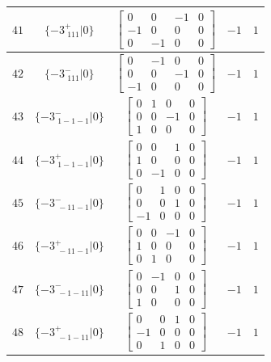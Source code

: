 \documentclass[fleqn,8pt]{jsarticle}
\begin{document}
\begin{longtable}{ccccc}
$ 41 $ & $ \{-3^{+}_{\,\,111}|0\} $ & $ \begin{bmatrix} 0 & 0 & -1 & 0 \\ -1 & 0 & 0 & 0 \\ 0 & -1 & 0 & 0 \end{bmatrix} $ & $ -1 $ & $ 1 $ \\ \hline
$ 42 $ & $ \{-3^{-}_{\,\,111}|0\} $ & $ \begin{bmatrix} 0 & -1 & 0 & 0 \\ 0 & 0 & -1 & 0 \\ -1 & 0 & 0 & 0 \end{bmatrix} $ & $ -1 $ & $ 1 $ \\ \hline
$ 43 $ & $ \{-3^{-}_{\,\,1-1-1}|0\} $ & $ \begin{bmatrix} 0 & 1 & 0 & 0 \\ 0 & 0 & -1 & 0 \\ 1 & 0 & 0 & 0 \end{bmatrix} $ & $ -1 $ & $ 1 $ \\ \hline
$ 44 $ & $ \{-3^{+}_{\,\,1-1-1}|0\} $ & $ \begin{bmatrix} 0 & 0 & 1 & 0 \\ 1 & 0 & 0 & 0 \\ 0 & -1 & 0 & 0 \end{bmatrix} $ & $ -1 $ & $ 1 $ \\ \hline
$ 45 $ & $ \{-3^{-}_{\,\,-11-1}|0\} $ & $ \begin{bmatrix} 0 & 1 & 0 & 0 \\ 0 & 0 & 1 & 0 \\ -1 & 0 & 0 & 0 \end{bmatrix} $ & $ -1 $ & $ 1 $ \\ \hline
$ 46 $ & $ \{-3^{+}_{\,\,-11-1}|0\} $ & $ \begin{bmatrix} 0 & 0 & -1 & 0 \\ 1 & 0 & 0 & 0 \\ 0 & 1 & 0 & 0 \end{bmatrix} $ & $ -1 $ & $ 1 $ \\ \hline
$ 47 $ & $ \{-3^{-}_{\,\,-1-11}|0\} $ & $ \begin{bmatrix} 0 & -1 & 0 & 0 \\ 0 & 0 & 1 & 0 \\ 1 & 0 & 0 & 0 \end{bmatrix} $ & $ -1 $ & $ 1 $ \\ \hline
$ 48 $ & $ \{-3^{+}_{\,\,-1-11}|0\} $ & $ \begin{bmatrix} 0 & 0 & 1 & 0 \\ -1 & 0 & 0 & 0 \\ 0 & 1 & 0 & 0 \end{bmatrix} $ & $ -1 $ & $ 1 $ \\
\end{longtable}
\end{document}

